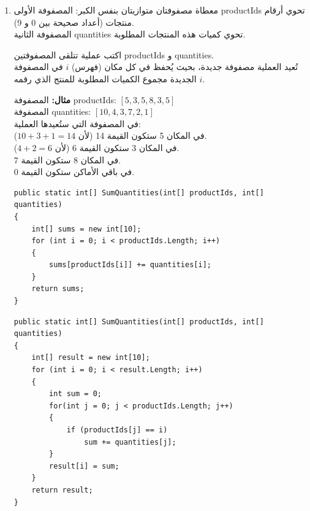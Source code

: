 \documentclass[14pt]{extarticle}
\begin{document}
\begin{enumerate}[itemsep=3em]
\item
معطاة مصفوفتان متوازيتان بنفس الكبر:
المصفوفة الأولى \textenglish{productIds} تحوي أرقام منتجات (أعداد صحيحة بين 0 و 9). \\
المصفوفة الثانية \textenglish{quantities} تحوي كميات هذه المنتجات المطلوبة.

اكتب عملية تتلقى المصفوفتين \textenglish{productIds} و \textenglish{quantities}. \\
تُعيد العملية مصفوفة جديدة، بحيث يُحفظ في كل مكان (فهرس) $i$ في المصفوفة الجديدة مجموع الكميات المطلوبة للمنتج الذي رقمه $i$.

\textbf{مثال:}
المصفوفة \textenglish{productIds}: $[5, 3, 5, 8, 3, 5]$ \\
المصفوفة \textenglish{quantities}: $[10, 4, 3, 7, 2, 1]$ \\
في المصفوفة التي ستُعيدها العملية: \\
في المكان 5 ستكون القيمة 14 (لأن $10 + 3 + 1 = 14$). \\
في المكان 3 ستكون القيمة 6 (لأن $4 + 2 = 6$). \\
في المكان 8 ستكون القيمة 7. \\
في باقي الأماكن ستكون القيمة 0.

\ifwithsols
\begin{boxSolution}
\begin{english}
\begin{verbatim}
public static int[] SumQuantities(int[] productIds, int[] quantities)
{
    int[] sums = new int[10];
    for (int i = 0; i < productIds.Length; i++)
    {
        sums[productIds[i]] += quantities[i];
    }
    return sums;
}
\end{verbatim}
\end{english}
\end{boxSolution}
\begin{boxSolution}[بديل]
\begin{english}
\begin{verbatim}
public static int[] SumQuantities(int[] productIds, int[] quantities)
{
    int[] result = new int[10];
    for (int i = 0; i < result.Length; i++)
    {
        int sum = 0;
        for(int j = 0; j < productIds.Length; j++)
        {
            if (productIds[j] == i)
                sum += quantities[j];
        }
        result[i] = sum;
    }
    return result;
}
\end{verbatim}
\end{english}
\end{boxSolution}
\clearpage
\fi


\end{enumerate}
\end{document}
